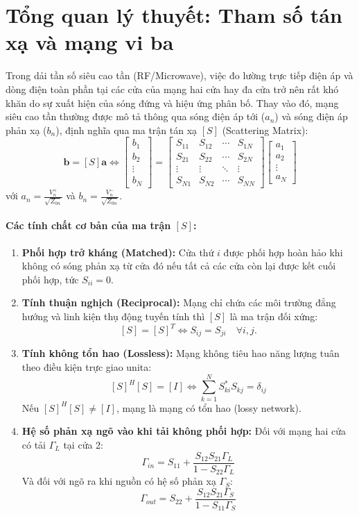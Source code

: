 \documentclass[12pt,a4paper]{article}
\begin{document}
\section*{Tổng quan lý thuyết: Tham số tán xạ và mạng vi ba}

Trong dải tần số siêu cao tần (RF/Microwave), việc đo lường trực tiếp điện áp và dòng điện toàn phần tại các cửa của mạng hai cửa hay đa cửa trở nên rất khó khăn do sự xuất hiện của sóng đứng và hiệu ứng phân bố. Thay vào đó, mạng siêu cao tần thường được mô tả thông qua sóng điện áp tới ($a_n$) và sóng điện áp phản xạ ($b_n$), định nghĩa qua ma trận tán xạ $[S]$ (Scattering Matrix):
\[
\mathbf{b} = [S]\mathbf{a} \iff \begin{bmatrix} b_1 \\ b_2 \\ \vdots \\ b_N \end{bmatrix} = \begin{bmatrix} S_{11} & S_{12} & \cdots & S_{1N} \\ S_{21} & S_{22} & \cdots & S_{2N} \\ \vdots & \vdots & \ddots & \vdots \\ S_{N1} & S_{N2} & \cdots & S_{NN} \end{bmatrix} \begin{bmatrix} a_1 \\ a_2 \\ \vdots \\ a_N \end{bmatrix}
\]
với $a_n = \frac{V_n^+}{\sqrt{Z_{0n}}}$ và $b_n = \frac{V_n^-}{\sqrt{Z_{0n}}}$.

\paragraph{Các tính chất cơ bản của ma trận $[S]$:}
\begin{enumerate}
    \item \textbf{Phối hợp trở kháng (Matched):} Cửa thứ $i$ được phối hợp hoàn hảo khi không có sóng phản xạ từ cửa đó nếu tất cả các cửa còn lại được kết cuối phối hợp, tức $S_{ii} = 0$.
    \item \textbf{Tính thuận nghịch (Reciprocal):} Mạng chỉ chứa các môi trường đẳng hướng và linh kiện thụ động tuyến tính thì $[S]$ là ma trận đối xứng:
    \[
    [S] = [S]^T \iff S_{ij} = S_{ji} \quad \forall i, j.
    \]
    \item \textbf{Tính không tổn hao (Lossless):} Mạng không tiêu hao năng lượng tuân theo điều kiện trực giao unita:
    \[
    [S]^H [S] = [I] \iff \sum_{k=1}^N S_{ki}^* S_{kj} = \delta_{ij}
    \]
    Nếu $[S]^H [S] \neq [I]$, mạng là mạng có tổn hao (lossy network).
    \item \textbf{Hệ số phản xạ ngõ vào khi tải không phối hợp:} Đối với mạng hai cửa có tải $\Gamma_L$ tại cửa 2:
    \[
    \Gamma_{in} = S_{11} + \frac{S_{12}S_{21}\Gamma_L}{1 - S_{22}\Gamma_L}
    \]
    Và đối với ngõ ra khi nguồn có hệ số phản xạ $\Gamma_S$:
    \[
    \Gamma_{out} = S_{22} + \frac{S_{12}S_{21}\Gamma_S}{1 - S_{11}\Gamma_S}
    \]
\end{enumerate}
\end{document}
